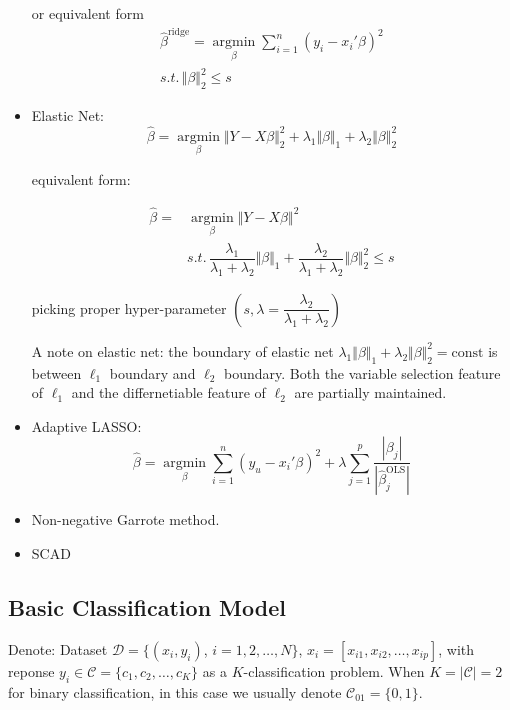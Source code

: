 \begin{itemize}[topsep=2pt,itemsep=0pt]
        or equivalent form 
        \begin{align}
            \hat{\beta }^\mathrm{ridge}=\mathop{\arg\min}\limits_{\beta } \sum_{i=1}^n(y_i-x_i'\beta )^2 \\
            s.t.\,\Vert \beta  \Vert _2^2\leq s
        \end{align}
        
        \item Elastic Net: 
        \[
            \hat{\beta }=\mathop{\arg\min}\limits_{\beta }\Vert Y-X\beta  \Vert _2^2+\lambda _1\Vert \beta  \Vert _1+\lambda _2\Vert \beta  \Vert _2^2  
        \]
        
        equivalent form:       
        
        \begin{align}
            \hat{\beta }=&\mathop{\arg\min}\limits_{\beta}\Vert Y-X\beta  \Vert ^2\\
            &s.t. \, \dfrac{\lambda _1}{\lambda _1+\lambda _2}\Vert \beta  \Vert_1+\dfrac{\lambda _2}{\lambda _1+\lambda _2}\Vert \beta  \Vert _2^2\leq s 
        \end{align}
        
        picking proper hyper-parameter $ (s,\lambda =\dfrac{\lambda _2}{\lambda _1+\lambda _2}) $

        A note on elastic net: the boundary of elastic net $ \lambda _1\Vert \beta  \Vert _1+\lambda _2\Vert \beta  \Vert _2^2  =\mathrm{const} $ is between $ \ell_1 $ boundary and $ \ell_2 $ boundary. Both the variable selection feature of $ \ell_1 $ and the differnetiable feature of $ \ell_2 $ are partially maintained.
        
        \item Adaptive LASSO:
        \[
            \hat{\beta}=\mathop{\arg\min}\limits_{\beta } \sum_{i=1}^n\left(y_u-x_i'\beta \right) ^2+\lambda \sum_{j=1}^p\dfrac{|\beta _j|}{|\hat{\beta }_j^{\mathrm{OLS}} |}
        \]
        \item Non-negative Garrote method.
        \item SCAD
    \end{itemize}
    
        
    
    
\subsection{Basic Classification Model}
    Denote: Dataset $\mathcal{D}=\{ (x_i,y_i) $, $ i=1,2,\ldots,N \}$, $ x_i=[x_{i1},x_{i2},\ldots,x_{ip}] $, with reponse $ y_i\in\mathcal{C}=\{c_1,c_2,\ldots ,c_K\} $ as a $ K $-classification problem. When $ K=|\mathcal{C}|=2 $ for binary classification, in this case we usually denote $ \mathcal{C}_{01}=\{0,1\}$.

